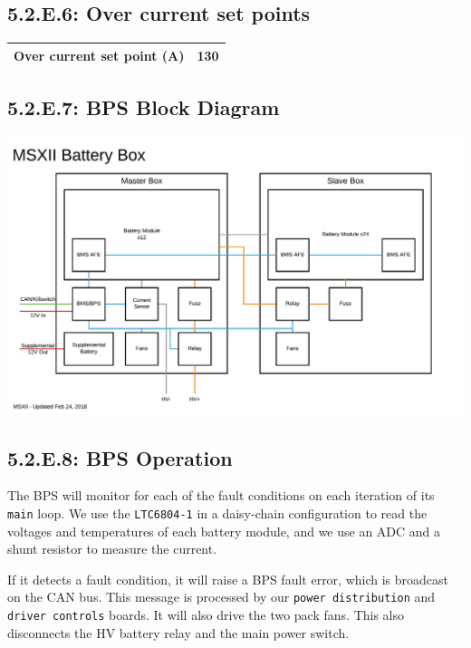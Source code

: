 \documentclass[10pt]{article}
\begin{document}
\subsection{5.2.E.6: Over current set points}

\begin{table}[!htbp]
\begin{tabular}{|l|l|}
\hline
\textbf{Over current set point (A)}    & 130 \\ \hline
\end{tabular}
\end{table}

\subsection{5.2.E.7: BPS Block Diagram}

\includegraphics[width=\textwidth,page=1]{figures/msxii-block-diagrams}

\subsection{5.2.E.8: BPS Operation}

The BPS will monitor for each of the fault conditions on each iteration of its
\texttt{main} loop. We use the \texttt{LTC6804-1} in a daisy-chain
configuration to read the voltages and temperatures of each battery module, and
we use an ADC and a shunt resistor to measure the current.

If it detects a fault condition, it will raise a BPS fault error, which is
broadcast on the CAN bus. This message is processed by our
\texttt{power distribution} and \texttt{driver controls} boards. It will also
drive the two pack fans. This also disconnects the HV battery relay and the
main power switch.
\end{document}
